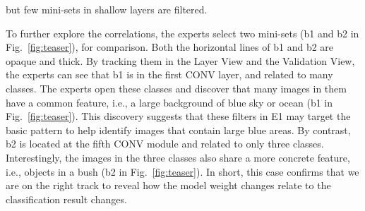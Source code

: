 \documentclass[format=acmsmall, review=false, screen=true]{acmart}
\newcommand{\dy}{\textcolor[rgb]{0,0,0}}
\begin{document}
but few mini-sets in shallow layers are filtered.%

To further explore the correlations,
the experts select two mini-sets (b1 and b2 in Fig.~\ref{fig:teaser}), for comparison. Both the horizontal lines of b1 and b2 are opaque and thick.
By tracking them in the Layer View and the Validation View, the experts can see that b1 is in the first CONV layer, and related to many classes.
The experts open these classes and discover that many images in them have a common feature, i.e., a large background of blue sky or ocean (b1 in Fig.~\ref{fig:teaser}).
This discovery suggests that these filters in E1 may target the basic pattern to help identify images that contain large blue areas.
By contrast, b2 is located at the fifth \dy{CONV module} and related to only three classes.
Interestingly, the images in the three classes also share a more concrete feature, i.e., objects in a bush (b2 in Fig.~\ref{fig:teaser}).
\dy{In short, this case confirms that we are on the right track to reveal how the model weight changes relate to the classification result changes.}%
\end{document}
